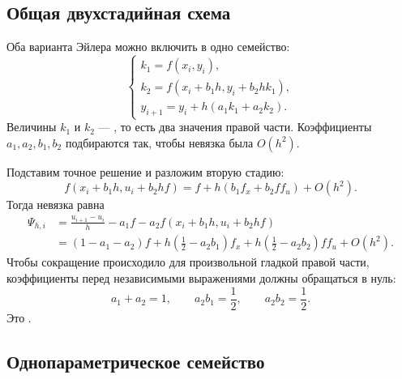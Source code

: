 \documentclass[../final.tex]{subfiles}
\begin{document}
\subsection{Общая двухстадийная схема}

Оба варианта Эйлера можно включить в одно семейство:
\begin{equation*}
    \begin{cases}
        k_1=f(x_i,y_i),\\
        k_2=f(x_i+b_1h,y_i+b_2h k_1),\\
        y_{i+1}=y_i+h(a_1 k_1+a_2 k_2).
    \end{cases}
\end{equation*}
Величины $k_1$ и $k_2$ --- , то есть
два значения правой части. Коэффициенты $a_1,a_2,b_1,b_2$
подбираются так, чтобы невязка была $O(h^2)$.

Подставим точное решение и разложим вторую стадию:
\begin{equation*}
    f(x_i+b_1h,u_i+b_2hf)
    =f+h(b_1f_x+b_2f f_u)+O(h^2).
\end{equation*}
Тогда невязка равна
\begin{align*}
    \Psi_{h,i}
    &=\frac{u_{i+1}-u_i}{h}
        -a_1f-a_2 f(x_i+b_1h,u_i+b_2hf)\\
    &=(1-a_1-a_2)f
      +h\left(\frac12-a_2b_1\right)f_x
      +h\left(\frac12-a_2b_2\right)f f_u+O(h^2).
\end{align*}
Чтобы сокращение происходило для произвольной гладкой правой части,
коэффициенты перед независимыми выражениями должны обращаться в нуль:
\begin{equation*}
    a_1+a_2=1,\qquad a_2b_1=\frac12,\qquad a_2b_2=\frac12.
\end{equation*}
Это .

\subsection{Однопараметрическое семейство}
\end{document}
